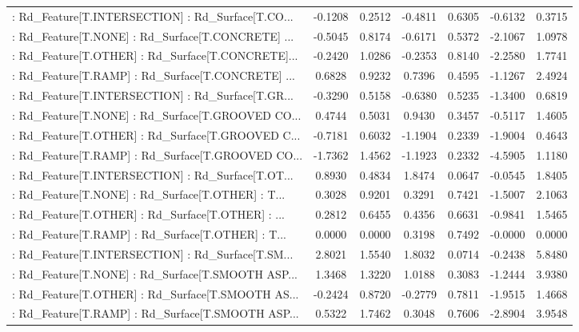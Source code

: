 \begin{longtable}{p{4cm}cccccc}
 : Rd\_Feature[T.INTERSECTION] : Rd\_Surface[T.CO... & -0.1208 &    0.2512 & -0.4811 &       0.6305 & -0.6132 &  0.3715 \\
 : Rd\_Feature[T.NONE] : Rd\_Surface[T.CONCRETE] ... & -0.5045 &    0.8174 & -0.6171 &       0.5372 & -2.1067 &  1.0978 \\
 : Rd\_Feature[T.OTHER] : Rd\_Surface[T.CONCRETE]... & -0.2420 &    1.0286 & -0.2353 &       0.8140 & -2.2580 &  1.7741 \\
 : Rd\_Feature[T.RAMP] : Rd\_Surface[T.CONCRETE] ... &  0.6828 &    0.9232 &  0.7396 &       0.4595 & -1.1267 &  2.4924 \\
 : Rd\_Feature[T.INTERSECTION] : Rd\_Surface[T.GR... & -0.3290 &    0.5158 & -0.6380 &       0.5235 & -1.3400 &  0.6819 \\
 : Rd\_Feature[T.NONE] : Rd\_Surface[T.GROOVED CO... &  0.4744 &    0.5031 &  0.9430 &       0.3457 & -0.5117 &  1.4605 \\
 : Rd\_Feature[T.OTHER] : Rd\_Surface[T.GROOVED C... & -0.7181 &    0.6032 & -1.1904 &       0.2339 & -1.9004 &  0.4643 \\
 : Rd\_Feature[T.RAMP] : Rd\_Surface[T.GROOVED CO... & -1.7362 &    1.4562 & -1.1923 &       0.2332 & -4.5905 &  1.1180 \\
 : Rd\_Feature[T.INTERSECTION] : Rd\_Surface[T.OT... &  0.8930 &    0.4834 &  1.8474 &       0.0647 & -0.0545 &  1.8405 \\
 : Rd\_Feature[T.NONE] : Rd\_Surface[T.OTHER] : T... &  0.3028 &    0.9201 &  0.3291 &       0.7421 & -1.5007 &  2.1063 \\
 : Rd\_Feature[T.OTHER] : Rd\_Surface[T.OTHER] : ... &  0.2812 &    0.6455 &  0.4356 &       0.6631 & -0.9841 &  1.5465 \\
 : Rd\_Feature[T.RAMP] : Rd\_Surface[T.OTHER] : T... &  0.0000 &    0.0000 &  0.3198 &       0.7492 & -0.0000 &  0.0000 \\
 : Rd\_Feature[T.INTERSECTION] : Rd\_Surface[T.SM... &  2.8021 &    1.5540 &  1.8032 &       0.0714 & -0.2438 &  5.8480 \\
 : Rd\_Feature[T.NONE] : Rd\_Surface[T.SMOOTH ASP... &  1.3468 &    1.3220 &  1.0188 &       0.3083 & -1.2444 &  3.9380 \\
 : Rd\_Feature[T.OTHER] : Rd\_Surface[T.SMOOTH AS... & -0.2424 &    0.8720 & -0.2779 &       0.7811 & -1.9515 &  1.4668 \\
 : Rd\_Feature[T.RAMP] : Rd\_Surface[T.SMOOTH ASP... &  0.5322 &    1.7462 &  0.3048 &       0.7606 & -2.8904 &  3.9548 \\

\end{longtable}
